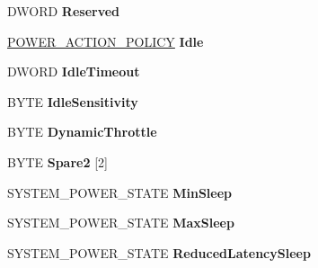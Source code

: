 \begin{DoxyCompactItemize}
D\+W\+O\+RD {\bfseries Reserved}
\item 
\mbox{\label{struct___s_y_s_t_e_m___p_o_w_e_r___p_o_l_i_c_y_a5f511a33cbff26cb62065677c255291b}} 
\hyperlink{struct___p_o_w_e_r___a_c_t_i_o_n___p_o_l_i_c_y}{P\+O\+W\+E\+R\+\_\+\+A\+C\+T\+I\+O\+N\+\_\+\+P\+O\+L\+I\+CY} {\bfseries Idle}
\item 
\mbox{\label{struct___s_y_s_t_e_m___p_o_w_e_r___p_o_l_i_c_y_aeaff11d5518df3955f282c62b701339e}} 
D\+W\+O\+RD {\bfseries Idle\+Timeout}
\item 
\mbox{\label{struct___s_y_s_t_e_m___p_o_w_e_r___p_o_l_i_c_y_a039eef3ecb8aef3a8b32257d77415d35}} 
B\+Y\+TE {\bfseries Idle\+Sensitivity}
\item 
\mbox{\label{struct___s_y_s_t_e_m___p_o_w_e_r___p_o_l_i_c_y_aa97de5cee2929ffcdaf62a5d6cd0c7d0}} 
B\+Y\+TE {\bfseries Dynamic\+Throttle}
\item 
\mbox{\label{struct___s_y_s_t_e_m___p_o_w_e_r___p_o_l_i_c_y_a1c860ff7940431cd19d0437b46bbce2b}} 
B\+Y\+TE {\bfseries Spare2} \mbox{[}2\mbox{]}
\item 
\mbox{\label{struct___s_y_s_t_e_m___p_o_w_e_r___p_o_l_i_c_y_a94c64356e48d635cd3e59ed17a12ce85}} 
S\+Y\+S\+T\+E\+M\+\_\+\+P\+O\+W\+E\+R\+\_\+\+S\+T\+A\+TE {\bfseries Min\+Sleep}
\item 
\mbox{\label{struct___s_y_s_t_e_m___p_o_w_e_r___p_o_l_i_c_y_a22f5dbe9e5c692e7bdc441af598640a0}} 
S\+Y\+S\+T\+E\+M\+\_\+\+P\+O\+W\+E\+R\+\_\+\+S\+T\+A\+TE {\bfseries Max\+Sleep}
\item 
\mbox{\label{struct___s_y_s_t_e_m___p_o_w_e_r___p_o_l_i_c_y_aaefd5a6ebc8f1c846b239cacd8d143bc}} 
S\+Y\+S\+T\+E\+M\+\_\+\+P\+O\+W\+E\+R\+\_\+\+S\+T\+A\+TE {\bfseries Reduced\+Latency\+Sleep}
\item 
\mbox{\label{struct___s_y_s_t_e_m___p_o_w_e_r___p_o_l_i_c_y_a19486c4062b4ac50474168572d4dcb9c}} 

\end{DoxyCompactItemize}
